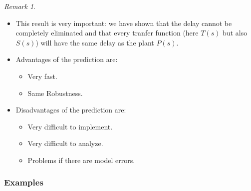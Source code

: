 \documentclass[a4paper,12 pt]{article}
\numberwithin{equation}{section}
\theoremstyle{definition}
\theoremstyle{remark}
\newtheorem*{bmk}{Remark}
\theoremstyle{definition}
\theoremstyle{definition}
\theoremstyle{definition}
\theoremstyle{remark}
\begin{document}
\begin{bmk}
\
\begin{itemize}
\item This result is very important: we have shown that the delay cannot be completely eliminated and that every tranfer function (here $T(s)$ but also $S(s)$) will have the same delay as the plant $P(s)$.
\item Advantages of the prediction are:
\begin{itemize}
\item Very fast.
\item Same Robustness.
\end{itemize}
\item Disadvantages of the prediction are:
\begin{itemize}
\item Very difficult to implement.
\item Very difficult to analyze.
\item Problems if there are model errors.
\end{itemize}

\end{itemize}
\end{bmk}

\newpage
\subsubsection{Examples}
\end{document}

